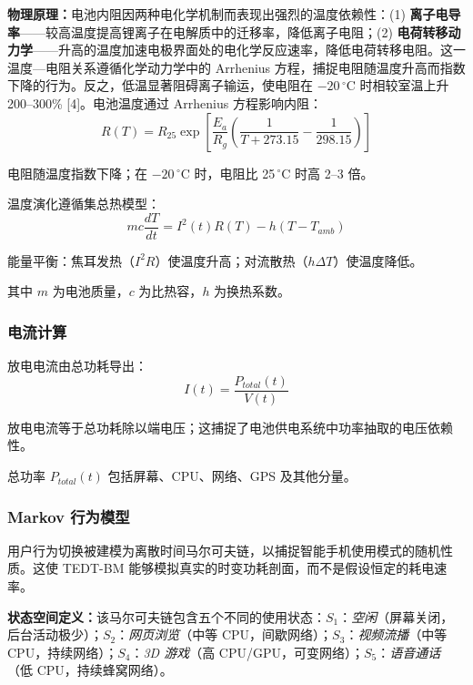 \documentclass[11pt,a4paper]{ctexart}
\begin{document}
\textbf{物理原理：}电池内阻因两种电化学机制而表现出强烈的温度依赖性：(1) \textbf{离子电导率}——较高温度提高锂离子在电解质中的迁移率，降低离子电阻；(2) \textbf{电荷转移动力学}——升高的温度加速电极界面处的电化学反应速率，降低电荷转移电阻。这一温度—电阻关系遵循化学动力学中的 Arrhenius 方程，捕捉电阻随温度升高而指数下降的行为。反之，低温显著阻碍离子输运，使电阻在 $-20\,^{\circ}$C 时相较室温上升 200--300\% [4]。电池温度通过 Arrhenius 方程影响内阻：
\begin{equation}
R(T) = R_{25}\exp\left[\frac{E_a}{R_g}\left(\frac{1}{T+273.15} - \frac{1}{298.15}\right)\right] \tag{4}
\end{equation}

电阻随温度指数下降；在 $-20\,^{\circ}$C 时，电阻比 25\,$^{\circ}$C 时高 2--3 倍。

温度演化遵循集总热模型：
\begin{equation}
mc\frac{dT}{dt} = I^2(t)R(T) - h\left(T - T_{amb}\right) \tag{5}
\end{equation}

能量平衡：焦耳发热（$I^2R$）使温度升高；对流散热（$h\Delta T$）使温度降低。

其中 $m$ 为电池质量，$c$ 为比热容，$h$ 为换热系数。

\subsubsection{电流计算}

放电电流由总功耗导出：
\begin{equation}
I(t) = \frac{P_{total}(t)}{V(t)} \tag{6}
\end{equation}

放电电流等于总功耗除以端电压；这捕捉了电池供电系统中功率抽取的电压依赖性。

总功率 $P_{total}(t)$ 包括屏幕、CPU、网络、GPS 及其他分量。

\subsubsection{Markov 行为模型}

用户行为切换被建模为离散时间马尔可夫链，以捕捉智能手机使用模式的随机性质。这使 TEDT-BM 能够模拟真实的时变功耗剖面，而不是假设恒定的耗电速率。

\textbf{状态空间定义：}该马尔可夫链包含五个不同的使用状态：$S_1$：\emph{空闲}（屏幕关闭，后台活动极少）；$S_2$：\emph{网页浏览}（中等 CPU，间歇网络）；$S_3$：\emph{视频流播}（中等 CPU，持续网络）；$S_4$：\emph{3D 游戏}（高 CPU/GPU，可变网络）；$S_5$：\emph{语音通话}（低 CPU，持续蜂窝网络）。
\end{document}
